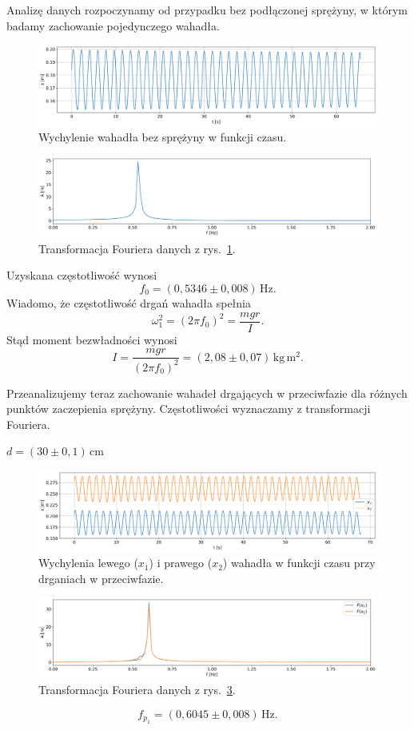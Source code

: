 \documentclass[12pt]{article}
\begin{document}
Analizę danych rozpoczynamy od przypadku bez podłączonej sprężyny, w którym badamy zachowanie pojedynczego wahadła.
\begin{figure}[H]
	\centering
	\includegraphics[width=\linewidth]{no_spring}
	\caption{Wychylenie wahadła bez sprężyny w funkcji czasu.}
	\label{fig:pendulum_nospring}
\end{figure}
\begin{figure}[H]
	\centering
	\includegraphics[width=\linewidth]{no_spring_fft}
	\caption{Transformacja Fouriera danych z rys.~\ref{fig:pendulum_nospring}.}
	\label{fig:pendulum_nospring_fft}
\end{figure}
Uzyskana częstotliwość wynosi
\[
	f_0 = (0{,}5346 \pm 0{,}008)\,\mathrm{Hz}.
\]
Wiadomo, że częstotliwość drgań wahadła spełnia\cite{skrypt}
\[
	\omega_1^2 = (2\pi f_0)^2 = \frac{mgr}{I}.
\]
Stąd moment bezwładności wynosi
\[
	I = \frac{mgr}{(2\pi f_0)^2} = (2{,}08 \pm 0{,}07)\,\mathrm{kg\,m^2}.
\]

Przeanalizujemy teraz zachowanie wahadeł drgających w przeciwfazie dla różnych punktów zaczepienia sprężyny. Częstotliwości wyznaczamy z transformacji Fouriera.

\newpage

\(d = (30 \pm 0{,}1)\,\mathrm{cm}\)
\begin{figure}[H]
	\centering
	\includegraphics[width=\linewidth]{counterphase_1}
	\caption{Wychylenia lewego (\(x_1\)) i prawego (\(x_2\)) wahadła w funkcji czasu przy drganiach w przeciwfazie.}
	\label{fig:counter_phase_0}
\end{figure}
\begin{figure}[H]
	\centering
	\includegraphics[width=\linewidth]{counterphase_1_fft}
	\caption{Transformacja Fouriera danych z rys.~\ref{fig:counter_phase_0}.}
	\label{fig:coutner_phase_0_fft}
\end{figure}
\[
	f_{p_1} = (0{,}6045 \pm 0{,}008)\,\mathrm{Hz}.
\]
\end{document}

